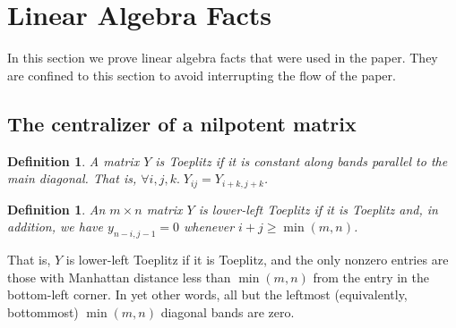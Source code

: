 \documentclass[12pt,psamsfonts]{article}
\newtheorem{definition}[theorem]{Definition}
\begin{document}
\section{Linear Algebra Facts}
In this section we prove linear algebra facts that were used in the paper.
They are confined to this section to avoid interrupting the flow of the paper.

\subsection{The centralizer of a nilpotent matrix}
\begin{definition}
    A matrix \(Y\) is \emph{Toeplitz} if it is constant along bands parallel to the main diagonal.
    That is, \(\forall i,j,k. \; Y_{ij} = Y_{i + k, j + k}\).
\end{definition}
\begin{definition}
    An \(m \times n\) matrix \(Y\) is \emph{lower-left Toeplitz} if it is Toeplitz and, in addition, we have \(y_{n - i, j - 1} = 0\) whenever \(i + j \geq \min(m,n)\).
\end{definition}
That is, \(Y\) is lower-left Toeplitz if it is Toeplitz, and the only nonzero entries are those with Manhattan distance less than \(\min(m,n)\) from the entry in the bottom-left corner.
In yet other words, all but the leftmost (equivalently, bottommost) \(\min(m,n)\) diagonal bands are zero.
\end{document}
